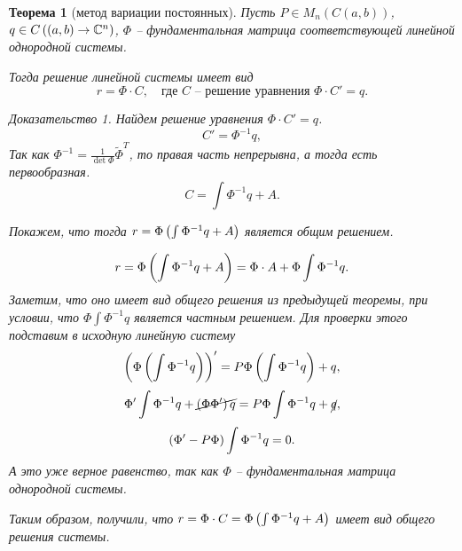 \documentclass[a5paper, 10pt]{article}
\theoremstyle{definition}
\theoremstyle{plain}
\newtheorem{Th}{Теорема}
\theoremstyle{remark}
\newtheorem*{Proof}{Доказательство}
\begin{document}
	\begin{Th}[метод вариации постоянных]
		Пусть $P \in M_n(C(a,b))$, $q\in C\left((a,b) \rightarrow \mathbb{C}^n\right)$, $\Phi$ -- фундаментальная матрица соответствующей линейной однородной системы. 
		
		Тогда решение линейной системы имеет вид 
		\[
		r = \Phi \cdot C, \quad \text{где } C \text{ -- решение уравнения } \Phi \cdot C' = q.
		\]
		\begin{Proof}
			Найдем решение уравнения $\Phi \cdot C' = q$.
			\[
			C' = \Phi^{-1} q,
			\]
			Так как $\Phi^{-1} = \frac1{\det \Phi} \tilde{\Phi}^{T}$, то правая часть непрерывна, а тогда есть первообразная.
			\[
			C = \int \Phi^{-1} q + A.
			\]
			
			Покажем, что тогда $r=\Phi \left(\int \Phi^{-1} q + A\right)$ является общим решением.
			
			\[
			r=\Phi \left(\int \Phi^{-1} q + A\right) = \Phi \cdot A + \Phi \int \Phi^{-1} q.
			\]
			Заметим, что оно имеет вид общего решения из предыдущей теоремы, при условии, что $\Phi \int \Phi^{-1} q$ является частным решением. Для проверки этого подставим в исходную линейную систему
			\[
			\left(\Phi \left(\int \Phi^{-1} q\right)\right)' = P \Phi \left(\int \Phi^{-1} q\right)+ q,
			\]
			\[
			\Phi' \int \Phi^{-1} q + \cancel{\left(\Phi \Phi'\right) q} = P \Phi \int \Phi^{-1} q + \cancel{q},
			\]
			\[
			\left(\Phi' - P\Phi\right) \int \Phi^{-1}q = 0.
			\]
			А это уже верное равенство, так как $\Phi$ -- фундаментальная матрица однородной системы.
			
			Таким образом, получили, что $r=\Phi\cdot C=\Phi \left(\int \Phi^{-1} q + A\right)$ имеет вид общего решения системы.
		\end{Proof}
	\end{Th}
\end{document}
